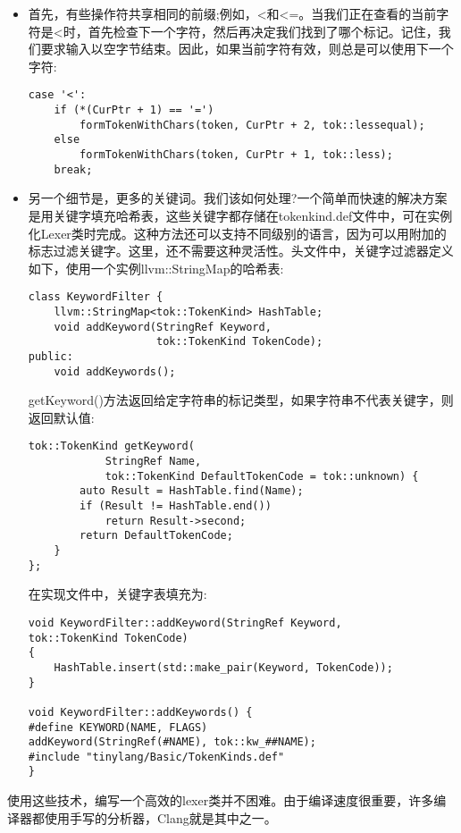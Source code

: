 \begin{itemize}
\item 首先，有些操作符共享相同的前缀;例如，<和<=。当我们正在查看的当前字符是<时，首先检查下一个字符，然后再决定我们找到了哪个标记。记住，我们要求输入以空字节结束。因此，如果当前字符有效，则总是可以使用下一个字符:
\begin{lstlisting}[caption={}]
case '<':
	if (*(CurPtr + 1) == '=')
		formTokenWithChars(token, CurPtr + 2, tok::lessequal);
	else
		formTokenWithChars(token, CurPtr + 1, tok::less);
	break;
\end{lstlisting}

\item 另一个细节是，更多的关键词。我们该如何处理?一个简单而快速的解决方案是用关键字填充哈希表，这些关键字都存储在tokenkind.def文件中，可在实例化Lexer类时完成。这种方法还可以支持不同级别的语言，因为可以用附加的标志过滤关键字。这里，还不需要这种灵活性。头文件中，关键字过滤器定义如下，使用一个实例llvm::StringMap的哈希表:
\begin{lstlisting}[caption={}]
class KeywordFilter {
	llvm::StringMap<tok::TokenKind> HashTable;
	void addKeyword(StringRef Keyword,
					tok::TokenKind TokenCode);
public:
	void addKeywords();
\end{lstlisting}

getKeyword()方法返回给定字符串的标记类型，如果字符串不代表关键字，则返回默认值:
\begin{lstlisting}[caption={}]
	tok::TokenKind getKeyword(
			StringRef Name,
			tok::TokenKind DefaultTokenCode = tok::unknown) {
		auto Result = HashTable.find(Name);
		if (Result != HashTable.end())
			return Result->second;
		return DefaultTokenCode;
	}
};
\end{lstlisting}

在实现文件中，关键字表填充为:
\begin{lstlisting}[caption={}]
void KeywordFilter::addKeyword(StringRef Keyword,
tok::TokenKind TokenCode)
{
	HashTable.insert(std::make_pair(Keyword, TokenCode));
}

void KeywordFilter::addKeywords() {
#define KEYWORD(NAME, FLAGS)
addKeyword(StringRef(#NAME), tok::kw_##NAME);
#include "tinylang/Basic/TokenKinds.def"
}
\end{lstlisting}

\end{itemize}

使用这些技术，编写一个高效的lexer类并不困难。由于编译速度很重要，许多编译器都使用手写的分析器，Clang就是其中之一。\par


































